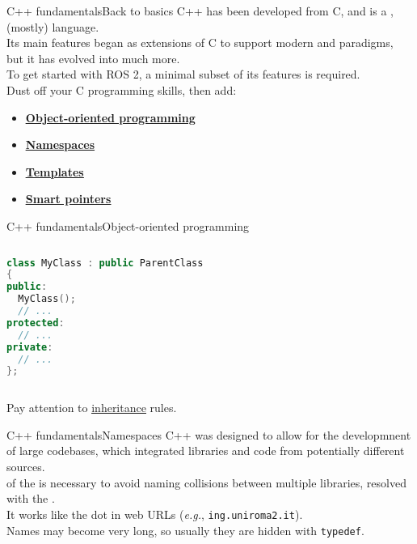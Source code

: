 \begin{frame}{C++ fundamentals}{Back to basics}
	C++ has been developed from C, and is a ,  (mostly) language.\\
	Its main features began as extensions of C to support modern  and  paradigms, but it has evolved into much more.\\
	\bigskip
	To get started with ROS 2, a minimal subset of its features is required.\\
	Dust off your C programming skills, then add:
	\begin{itemize}
		\item \href{https://www.geeksforgeeks.org/c-classes-and-objects/}{\color{blue}\underline{\textbf{Object-oriented programming}}}
		\item \href{https://www.geeksforgeeks.org/namespace-in-c/}{\color{blue}\underline{\textbf{Namespaces}}}
		\item \href{https://www.geeksforgeeks.org/templates-cpp/}{\color{blue}\underline{\textbf{Templates}}}
		\item \href{https://www.geeksforgeeks.org/smart-pointers-cpp/}{\color{blue}\underline{\textbf{Smart pointers}}}
	\end{itemize}
\end{frame}
\begin{frame}[fragile]{C++ fundamentals}{Object-oriented programming}
	\begin{columns}
		\begin{lstlisting}[language=C++, caption=Example of definition of a C++ class.]
class MyClass : public ParentClass
{
public:
  MyClass();
  // ...
protected:
  // ...
private:
  // ...
};\end{lstlisting}
	\end{columns}
	Pay attention to \href{https://www.geeksforgeeks.org/inheritance-in-c/}{\color{blue}\underline{inheritance}} rules.
\end{frame}
\begin{frame}{C++ fundamentals}{Namespaces}
  C++ was designed to allow for the developmnent of large codebases, which integrated libraries and code from potentially different sources.\\
  \bigskip
   of the  is necessary to avoid naming collisions between multiple libraries, resolved with the .\\
  It works like the dot in web URLs (\emph{e.g.}, \texttt{ing.uniroma2.it}).\\
  \bigskip
  Names may become very long, so usually they are hidden with \texttt{typedef}.
\end{frame}
